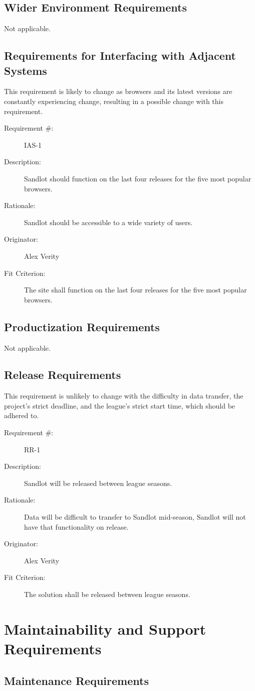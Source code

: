 \documentclass[12pt]{article}
\newenvironment{myreq}[1]{%
\setlist[description]{font=\normalfont\color{darkgray}}%
\begin{tcolorbox}[colframe=black,colback=white, sharp corners, boxrule=1pt]%
\bfseries\color{blue}%
\begin{description}#1}%
{\end{description}\end{tcolorbox}}
\newcommand{\twoinline}[2]{\begin{multicols}{2}#1 #2\end{multicols}}
\newcommand{\reqno}{\item[Requirement \#:]}
\newcommand{\reqdesc}{\item[Description:]}
\newcommand{\reqrat}{\item[Rationale:]}
\newcommand{\reqorig}{\item[Originator:]}
\newcommand{\reqfit}{\item[Fit Criterion:]}
\newcommand{\reqsatis}{\item[Customer Satisfaction:]}
\newcommand{\reqdissat}{\item[Customer Dissatisfaction:]}
\begin{document}
\subsection{Wider Environment Requirements}
Not applicable.
\subsection{Requirements for Interfacing with Adjacent Systems}

This requirement is likely to change as browsers and its latest versions are
constantly experiencing change, resulting in a possible change with this requirement. 

\begin{myreq}
  \reqno IAS-1
  \reqdesc Sandlot should function on the last four releases for the five
  most popular browsers.
  \reqrat Sandlot should be accessible to a wide variety of users.
  \reqorig Alex Verity
  \reqfit The site shall function on the last four releases for the five most
  popular browsers.
  \twoinline
    {\reqsatis 2}
    {\reqdissat 4}
\end{myreq}

\subsection{Productization Requirements}
Not applicable.
\subsection{Release Requirements}

This requirement is unlikely to change with the difficulty in data transfer,
the project's strict deadline, and the league's strict start time, which should be adhered to. 

\begin{myreq}
  \reqno RR-1
  \reqdesc Sandlot will be released between league seasons.
  \reqrat Data will be difficult to transfer to Sandlot mid-season, Sandlot
  will not have that functionality on release.
  \reqorig Alex Verity
  \reqfit The solution shall be released between league seasons.
  \twoinline
    {\reqsatis 2}
    {\reqdissat 2}
\end{myreq}

\section{Maintainability and Support Requirements}
\subsection{Maintenance Requirements}
\end{document}
